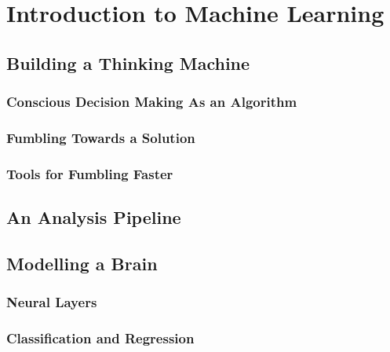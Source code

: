 \chapter{Introduction to Machine Learning}

\section{Building a Thinking Machine}

\subsection{Conscious Decision Making As an Algorithm}

\subsection{Fumbling Towards a Solution}

\subsection{Tools for Fumbling Faster}

\section{An Analysis Pipeline}

\section{Modelling a Brain}

\subsection{Neural Layers}

\subsection{Classification and Regression}